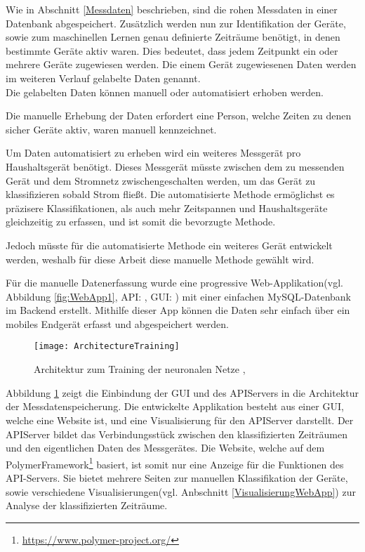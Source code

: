         Wie in Abschnitt \ref{Messdaten} beschrieben, sind die rohen Messdaten in einer Datenbank abgespeichert.
        Zusätzlich werden nun zur Identifikation der Geräte, sowie zum maschinellen Lernen genau definierte Zeiträume benötigt, in denen bestimmte Geräte aktiv waren.
        Dies bedeutet, dass jedem Zeitpunkt ein oder mehrere Geräte zugewiesen werden. 
        Die einem Gerät zugewiesenen Daten werden im weiteren Verlauf gelabelte Daten genannt.\\
        \newline
        Die gelabelten Daten können manuell oder automatisiert erhoben werden.

        Die manuelle Erhebung der Daten erfordert eine Person, welche Zeiten zu denen sicher Geräte aktiv, waren manuell kennzeichnet.

        Um Daten automatisiert zu erheben wird ein weiteres Messgerät pro Haushaltsgerät benötigt.
        Dieses Messgerät müsste zwischen dem zu messenden Gerät und dem Stromnetz zwischengeschalten werden, um das Gerät zu klassifizieren sobald Strom fließt.
        Die automatisierte Methode ermöglichst es präzisere Klassifikationen, als auch mehr Zeitspannen und Haushaltsgeräte gleichzeitig zu erfassen, und ist somit die bevorzugte Methode.

        Jedoch müsste für die automatisierte Methode ein weiteres Gerät entwickelt werden, weshalb für diese Arbeit diese manuelle Methode gewählt wird.\\
        \newline

        Für die manuelle Datenerfassung wurde eine progressive Web-Applikation(vgl. Abbildung \ref{fig:WebApp1}, API: \cite{WesenseAPIRepo}, GUI: \cite{WesenseGUIRepo}) mit einer einfachen MySQL-Datenbank im Backend erstellt.
        Mithilfe dieser App können die Daten sehr einfach über ein mobiles Endgerät erfasst und abgespeichert werden.
        \newline

        \begin{figure}[h]
            \centering
            \texttt{[image: ArchitectureTraining]}
            \caption{Architektur zum Training der neuronalen Netze \protect\cite{DrawIO}, \protect\cite{Tensorflow}}
            \label{fig:ArchitectureTraining}
        \end{figure}

        Abbildung \ref{fig:ArchitectureTraining} zeigt die Einbindung der GUI und des API\-Servers in die Architektur der Messdatenspeicherung.
        Die entwickelte Applikation besteht aus einer GUI, welche eine Website ist, und eine Visualisierung für den API\-Server darstellt.
        Der API\-Server bildet das Verbindungsstück zwischen den klassifizierten Zeiträumen und den eigentlichen Daten des Messgerätes.
        Die Website, welche auf dem Polymer\-Framework\footnote{\url{https://www.polymer-project.org/}} basiert, ist somit nur eine Anzeige für die Funktionen des API-Servers.
        Sie bietet mehrere Seiten zur manuellen Klassifikation der Geräte, sowie verschiedene Visualisierungen(vgl. Anbschnitt \ref{VisualisierungWebApp}) zur Analyse der klassifizierten Zeiträume.

